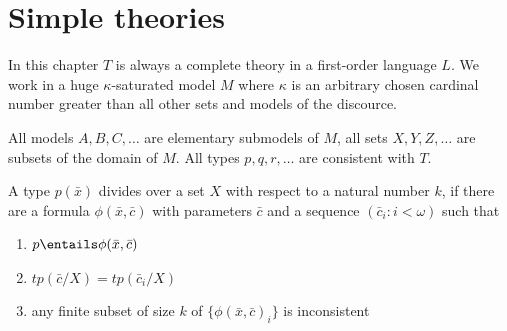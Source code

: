 \section{Simple theories}
\vspace{10.5cm}

In this chapter $T$ is always a complete theory in a first-order language $L$. We work in a huge $\kappa$-saturated
model $M$ where $\kappa$ is an arbitrary chosen cardinal number greater than all other sets and models of the 
discource.

All models $A, B, C, \dots$ are elementary submodels of $M$, all sets $X, Y, Z,\dots$ are subsets of the domain of 
$M$. All types $p, q, r, \dots$ are consistent with $T$.

A type $p(\bar{x})$ divides over a set $X$ with respect to a natural number $k$, if there are a formula $\phi(\bar{x}, \bar{c})$ with
parameters $\bar{c}$ and a sequence $(\bar{c}_i: i < \omega)$ such that

\begin{enumerate}[label={(\roman*)}]
    \item 
    $p\entails\phi(\bar{x}, \bar{c})$
    \item 
    $tp(\bar{c}/X) = tp(\bar{c}_i/X)$
    \item 
    any finite subset of size $k$ of $\{\phi(\bar{x}, \bar{c})_i\}$ is inconsistent
\end{enumerate}


